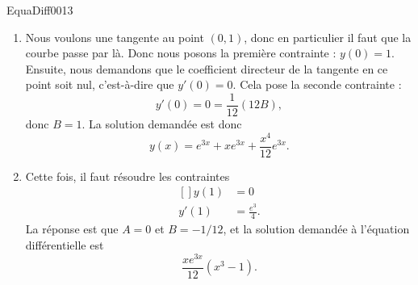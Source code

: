 \begin{corrige}{EquaDiff0013}
\begin{enumerate}
\begin{enumerate}
				\item
					Nous voulons une tangente au point $(0,1)$, donc en particulier il faut que la courbe passe par là. Donc nous posons la première contrainte : $y(0)=1$. Ensuite, nous demandons que le coefficient directeur de la tangente en ce point soit nul, c'est-à-dire que $y'(0)=0$. Cela pose la seconde contrainte : 
					\begin{equation}
						y'(0)=0=\frac{ 1 }{ 12 }(12B), 
					\end{equation}
					donc $B=1$. La solution demandée est donc
					\begin{equation}
						y(x)= e^{3x}+x e^{3x}+\frac{ x^4 }{ 12 } e^{3x}.
					\end{equation}

				\item
					Cette fois, il faut résoudre les contraintes
					\begin{equation}
						\begin{aligned}[]
							y(1)&=0\\
							y'(1)&=\frac{ e^3 }{ 4 }.
						\end{aligned}
					\end{equation}
					La réponse est que $A=0$ et $B=-1/12$, et la solution demandée à l'équation différentielle est
					\begin{equation}
						\frac{ x e^{3x} }{ 12 }(x^3-1).
					\end{equation}
			\end{enumerate}
	\end{enumerate}
\end{corrige}
